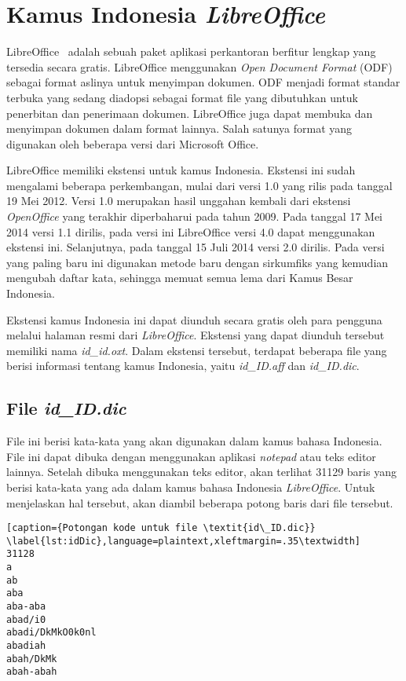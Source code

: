 \section{Kamus Indonesia \textit{LibreOffice}}
\label{sec:kamusindo}

LibreOffice~\cite{libreoffice} adalah sebuah paket aplikasi perkantoran berfitur lengkap yang tersedia secara gratis. LibreOffice menggunakan \textit{Open Document Format} (ODF) sebagai format aslinya untuk menyimpan dokumen. ODF menjadi format standar terbuka yang sedang diadopsi sebagai format file yang dibutuhkan untuk penerbitan dan penerimaan dokumen. LibreOffice juga dapat membuka dan menyimpan dokumen dalam format lainnya. Salah satunya format yang digunakan oleh beberapa versi dari Microsoft Office.

LibreOffice memiliki ekstensi untuk kamus Indonesia. Ekstensi ini sudah mengalami beberapa perkembangan, mulai dari versi 1.0 yang rilis pada tanggal 19 Mei 2012. Versi 1.0 merupakan hasil unggahan kembali dari ekstensi \textit{OpenOffice} yang terakhir diperbaharui pada tahun 2009. Pada tanggal 17 Mei 2014 versi 1.1 dirilis, pada versi ini LibreOffice versi 4.0 dapat menggunakan ekstensi ini. Selanjutnya, pada tanggal 15 Juli 2014 versi 2.0 dirilis. Pada versi yang paling baru ini digunakan metode baru dengan sirkumfiks yang kemudian mengubah daftar kata, sehingga memuat semua lema dari Kamus Besar Indonesia.

Ekstensi kamus Indonesia ini dapat diunduh secara gratis oleh para pengguna melalui halaman resmi dari \textit{LibreOffice}. Ekstensi yang dapat diunduh tersebut memiliki nama \textit{id\_id.oxt}. Dalam ekstensi tersebut, terdapat beberapa file yang berisi informasi tentang kamus Indonesia, yaitu \textit{id\_ID.aff} dan \textit{id\_ID.dic}.

\subsection{File \textit{id\_ID.dic}}

File ini berisi kata-kata yang akan digunakan dalam kamus bahasa Indonesia. File ini dapat dibuka dengan menggunakan aplikasi \textit{notepad} atau teks editor lainnya. Setelah dibuka menggunakan teks editor, akan terlihat 31129 baris yang berisi kata-kata yang ada dalam kamus bahasa Indonesia \textit{LibreOffice}. Untuk menjelaskan hal tersebut, akan diambil beberapa potong baris dari file tersebut.
	
	\begin{lstlisting}[caption={Potongan kode untuk file \textit{id\_ID.dic}}			\label{lst:idDic},language=plaintext,xleftmargin=.35\textwidth] 
31128
a
ab
aba
aba-aba
abad/i0
abadi/DkMkO0k0nl
abadiah
abah/DkMk
abah-abah
	\end{lstlisting}	
	
